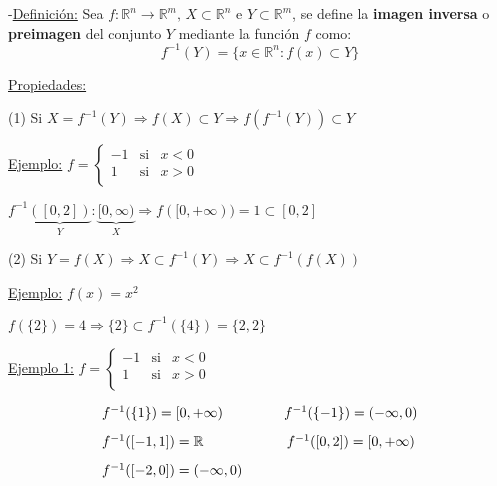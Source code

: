 \documentclass[10pt, titlepage]{article}
\newcommand{\R}{\mathbb{R}}
\newcommand{\definicion}{\noindent-\underline{Definición:} }
\newcommand{\dindent}{\indent\indent}
\newcommand{\tindent}{\indent\indent\indent}
\begin{document}
\definicion Sea $f : \R^n \to \R^m, \, X \subset \R^n \text{ e } Y \subset \R^m$, se define la 
\textbf{imagen inversa} o \textbf{preimagen} del conjunto $Y$ mediante la función $f$ como:
\[
\boxed{
f^{-1} (Y) = \{x \in \R^n : f (x) \subset Y\}
}
\]
\vspace{3mm}

\underline{Propiedades:}
\vspace{3mm}

\dindent (1) Si $X = f^{-1} (Y) \Rightarrow f (X) \subset Y \Rightarrow f (f^{-1} (Y)) \subset Y$
\vspace{3mm}

\tindent \underline{Ejemplo:} $f = 
\left \{ \begin{array}{ccc}

-1 & \text{si} & x < 0\\
1 & \text{si} & x>0\\

\end{array}\right.$
\vspace{2mm}

\tindent \indent $f^{-1} \underbrace{([0, 2])}_{Y} : \underbrace{[0, \infty)}_{X} \Rightarrow f ([0, +\infty)) 
= {1} \subset [0, 2]$
\vspace{3mm}

\dindent (2) Si $Y = f (X) \Rightarrow X \subset f^{-1} (Y) \Rightarrow X \subset f^{-1} (f (X))$
\vspace{3mm}

\tindent \underline{Ejemplo:} $f (x) = x^2$
\vspace{3mm}

\tindent \indent $f (\{2\}) = 4 \Rightarrow \{2\} \subset f^{-1} (\{4\}) = \{2, 2\}$
\vspace{5mm}

\underline{Ejemplo 1:} $
f = 
\left \{ \begin{array}{ccc}

-1 & \text{si} & x < 0\\
1 & \text{si} & x>0\\

\end{array}\right.
$
\vspace{3mm}

\[
\begin{array}{lccrc}

f^{-1} (\{1\}) = [0, +\infty) & \quad & f^{-1} (\{-1\}) = (- \infty, 0) \vspace{3mm}\\
f^{-1} ([-1, 1]) = \R & \quad & f^{-1} ([0, 2]) = [0, +\infty)\vspace{3mm}\\
f^{-1} ([-2, 0]) = (-\infty, 0) & \quad &\\

\end{array}
\]
\vspace{3mm}
\end{document}
